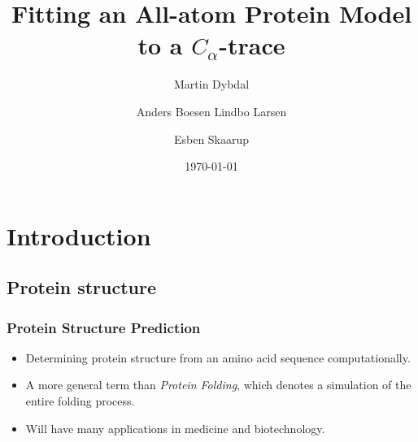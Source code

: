 \documentclass{beamer}
\title{Fitting an All-atom Protein Model to a $C_{\alpha}$-trace}
\author{\small Martin Dybdal \and Anders Boesen Lindbo Larsen \and Esben Skaarup}
\institute{\textrm{Datalogisk Institut, Københavns Universitet}}
\date{\today}
\begin{document}
\frame{\titlepage}

\section{Introduction}
\subsection{Protein structure}

\begin{frame}[t, fragile]
  \frametitle{Protein Structure Prediction}
  \begin{itemize}
  \item Determining protein structure from an amino acid sequence computationally.
  \item A more general term than \textit{Protein Folding}, which denotes a
    simulation of the entire folding process.
  \item Will have many applications in medicine and biotechnology.
  \end{itemize}
\end{frame}
\end{document}
